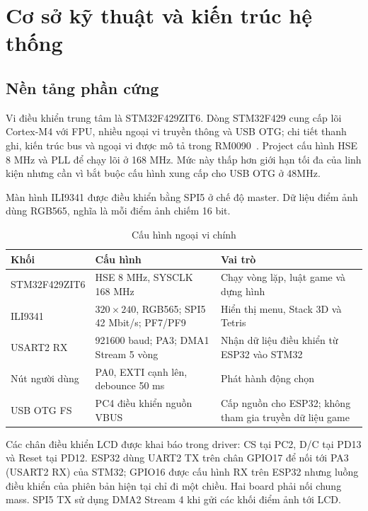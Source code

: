\chapter{Cơ sở kỹ thuật và kiến trúc hệ thống}
\label{chap:architecture}

\section{Nền tảng phần cứng}

Vi điều khiển trung tâm là STM32F429ZIT6. Dòng STM32F429 cung cấp lõi Cortex-M4 với FPU, nhiều ngoại vi truyền thông và USB OTG; chi tiết thanh ghi, kiến trúc bus và ngoại vi được mô tả trong RM0090~\cite{stm32datasheet,rm0090}. Project cấu hình HSE 8 MHz và PLL để chạy lõi ở 168 MHz. Mức này thấp hơn giới hạn tối đa của linh kiện nhưng cần vì bắt buộc cấu hình xung cấp cho USB OTG ở 48MHz.

Màn hình ILI9341 được điều khiển bằng SPI5 ở chế độ master. Dữ liệu điểm ảnh dùng RGB565, nghĩa là mỗi điểm ảnh chiếm 16 bit.

\begin{table}[H]
\centering
\small
\caption{Cấu hình ngoại vi chính}
\label{tab:hardware}
\begin{tabularx}{\textwidth}{@{}L{0.20\textwidth}L{0.27\textwidth}Y@{}}
\toprule
\textbf{Khối} & \textbf{Cấu hình} & \textbf{Vai trò} \\
\midrule
STM32F429ZIT6 & HSE 8 MHz, SYSCLK 168 MHz & Chạy vòng lặp, luật game và dựng hình \\
ILI9341 & $320\times240$, RGB565; SPI5 42 Mbit/s; PF7/PF9 & Hiển thị menu, Stack 3D và Tetris \\
USART2 RX & 921600 baud; PA3; DMA1 Stream 5 vòng & Nhận dữ liệu điều khiển từ ESP32 vào STM32 \\
Nút người dùng & PA0, EXTI cạnh lên, debounce 50 ms & Phát hành động chọn \\
USB OTG FS & PC4 điều khiển nguồn VBUS & Cấp nguồn cho ESP32; không tham gia truyền dữ liệu game \\
\bottomrule
\end{tabularx}
\end{table}

Các chân điều khiển LCD được khai báo trong driver: CS tại PC2, D/C tại PD13 và Reset tại PD12. ESP32 dùng UART2 TX trên chân GPIO17 để nối tới PA3 (USART2 RX) của STM32; GPIO16 được cấu hình RX trên ESP32 nhưng luồng điều khiển của phiên bản hiện tại chỉ đi một chiều. Hai board phải nối chung mass. SPI5 TX sử dụng DMA2 Stream 4 khi gửi các khối điểm ảnh tới LCD.


